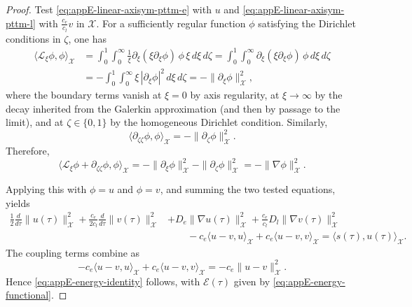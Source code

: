 \begin{proof}
    Test \eqref{eq:appE-linear-axisym-pttm-e} with \(u\) and
    \eqref{eq:appE-linear-axisym-pttm-l} with \(\frac{c_e}{c_l}v\) in
    \(\mathcal X\). For a sufficiently regular function \(\phi\) satisfying the
    Dirichlet conditions in \(\zeta\), one has
    \begin{align*}
        \bigl\langle \mathcal L_\xi \phi,\phi\bigr\rangle_{\mathcal X}
         & =
        \int_0^1\!\!\int_0^\infty
        \frac{1}{\xi}\partial_\xi(\xi\partial_\xi\phi)\,\phi\,
        \xi\, d\xi\, d\zeta
        =
        \int_0^1\!\!\int_0^\infty
        \partial_\xi(\xi\partial_\xi\phi)\,\phi\, d\xi\, d\zeta
        \\
         & =
        -\int_0^1\!\!\int_0^\infty
        \xi\, |\partial_\xi\phi|^2\, d\xi\, d\zeta
        =
        -\|\partial_\xi\phi\|_{\mathcal X}^2,
    \end{align*}
    where the boundary terms vanish at \(\xi=0\) by axis regularity, at
    \(\xi\to\infty\) by the decay inherited from the Galerkin approximation (and
    then by passage to the limit), and at \(\zeta\in\{0,1\}\) by the homogeneous
    Dirichlet condition. Similarly,
    \[
        \bigl\langle \partial_{\zeta\zeta}\phi,\phi\bigr\rangle_{\mathcal X}
        =
        -\|\partial_\zeta\phi\|_{\mathcal X}^2.
    \]
    Therefore,
    \[
        \bigl\langle \mathcal L_\xi\phi+\partial_{\zeta\zeta}\phi,\phi
        \bigr\rangle_{\mathcal X}
        =
        -\|\partial_\xi\phi\|_{\mathcal X}^2
        -\|\partial_\zeta\phi\|_{\mathcal X}^2
        =
        -\|\nabla \phi\|_{\mathcal X}^2.
    \]

    Applying this with \(\phi=u\) and \(\phi=v\), and summing the two tested
    equations, yields
    \begin{align*}
        \frac{1}{2}\frac{d}{d\tau}\|u(\tau)\|_{\mathcal X}^2
        +
        \frac{c_e}{2c_l}\frac{d}{d\tau}\|v(\tau)\|_{\mathcal X}^2
         & +
        D_e\|\nabla u(\tau)\|_{\mathcal X}^2
        +
        \frac{c_e}{c_l}D_l\|\nabla v(\tau)\|_{\mathcal X}^2
        \\
         & \qquad
        -c_e\langle u-v,u\rangle_{\mathcal X}
        +
        c_e\langle u-v,v\rangle_{\mathcal X}
        =
        \langle s(\tau),u(\tau)\rangle_{\mathcal X}.
    \end{align*}
    The coupling terms combine as
    \[
        -c_e\langle u-v,u\rangle_{\mathcal X}
        +
        c_e\langle u-v,v\rangle_{\mathcal X}
        =
        -c_e\|u-v\|_{\mathcal X}^2.
    \]
    Hence
    \eqref{eq:appE-energy-identity} follows, with
    \(\mathcal E(\tau)\) given by \eqref{eq:appE-energy-functional}.


\end{proof}
